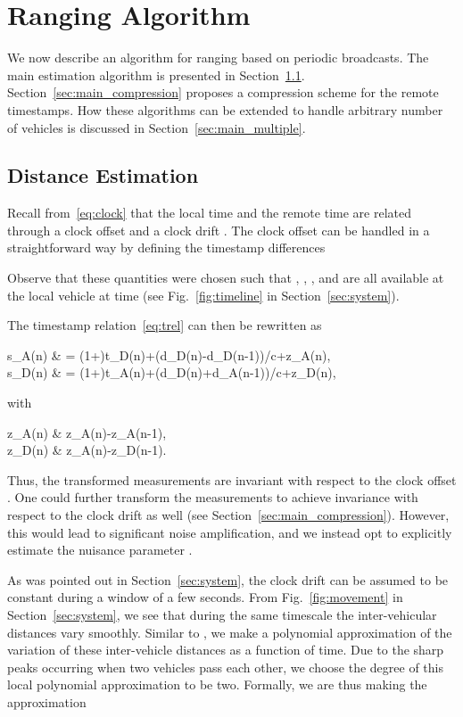\documentclass[12pt,journal,final,onecolumn]{IEEEtran}
\newcommand{\defeq}{\mathrel{\triangleq}}
\theoremstyle{definition}
\theoremstyle{myremark}
\newcommand{\dtd}{\Delta t_D}
\newcommand{\dta}{\Delta t_A}
\newcommand{\dsd}{\Delta s_D}
\newcommand{\dsa}{\Delta s_A}
\begin{document}
\section{Ranging Algorithm}
\label{sec:main}

We now describe an algorithm for ranging based on periodic broadcasts. The main
estimation algorithm is presented in Section~\ref{sec:main_poly}.
Section~\ref{sec:main_compression} proposes a compression scheme for the remote
timestamps. How these algorithms can be extended to handle arbitrary number of
vehicles is discussed in Section~\ref{sec:main_multiple}.


\subsection{Distance Estimation}
\label{sec:main_poly}

Recall from~\eqref{eq:clock} that the local time  and the remote time  are
related through a clock offset  and a clock drift . The clock
offset can be handled in a straightforward way by defining the timestamp
differences

Observe that these quantities were chosen such that
, , , and  are all available
at the local vehicle at time  (see Fig.~\ref{fig:timeline} in
Section~\ref{sec:system}). 

The timestamp relation~\eqref{eq:trel} can then be rewritten as

        \dsa(n)
        & = (1+\delta)\dtd(n)+(d_D(n)-d_D(n-1))/c+\Delta z_A(n), \\
        \dsd(n) 
        & = (1+\delta)\dta(n)+(d_D(n)+d_A(n-1))/c+\Delta z_D(n), 
    
with

        \Delta z_A(n) & \defeq z_A(n)-z_A(n-1), \\
        \Delta z_D(n) & \defeq z_A(n)-z_D(n-1).
    
Thus, the transformed measurements are invariant with respect to the clock
offset .  One could further transform the measurements to achieve
invariance with respect to the clock drift  as well (see
Section~\ref{sec:main_compression}).  However, this would lead to significant
noise amplification, and we instead opt to explicitly estimate the nuisance
parameter .

As was pointed out in Section~\ref{sec:system}, the clock drift  can be
assumed to be constant during a window of a few seconds. From
Fig.~\ref{fig:movement} in Section~\ref{sec:system}, we see that during the same
timescale the inter-vehicular distances vary smoothly. Similar to
\cite{rajan2012joint}, we make a polynomial approximation of the variation of
these inter-vehicle distances as a function of time.  Due to the sharp peaks
occurring when two vehicles pass each other, we choose the degree of this local
polynomial approximation to be two. Formally, we are thus making the
approximation
\end{document}
